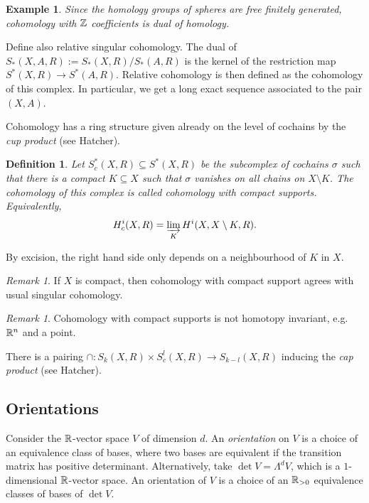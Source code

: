 \documentclass[A4paper, british]{amsart}
\theoremstyle{darkgreentheorem}
\theoremstyle{darkbluedefinition}
\newtheorem{defn}[thm]{Definition}
\theoremstyle{darkredexample}
\newtheorem{exa}[thm]{Example}
\theoremstyle{remark}
\newtheorem{rem}[thm]{Remark}
\newcommand{\1}{\mathbbm{1}}
\newcommand{\tms}{\times}
\newcommand{\sub}{\subseteq}
\begin{document}
\begin{exa}
    Since the homology groups of spheres are free finitely generated, cohomology with $\mathbb{Z}$ coefficients is dual of homology.
\end{exa}

Define also relative singular cohomology.
The dual of $S_{*}(X,A,R):=S_{*}(X,R)/S_{*}(A,R)$ is the kernel of the restriction map $S^{*}(X,R)\to S^{*}(A,R)$.
Relative cohomology is then defined as the cohomology of this complex.
In particular, we get a long exact sequence associated to the pair $(X,A)$.

Cohomology has a ring structure given already on the level of cochains by the \textit{cup product} (see Hatcher).

\begin{defn}
    Let $S_{c}^{*}(X,R)\sub S^{*}(X,R)$ be the subcomplex of cochains $\sigma$ such that there is a compact $K\sub X$ such that $\sigma$ vanishes on all chains on $X\setminus K$.
    The cohomology of this complex is called \textit{cohomology with compact supports}.
    Equivalently,
    \[ H^{i}_{c}(X,R)=\varinjlim_{K}H^{i}(X,X\setminus K,R). \]
\end{defn}

By excision, the right hand side only depends on a neighbourhood of $K$ in $X$.

\begin{rem}
    If $X$ is compact, then cohomology with compact support agrees with usual singular cohomology.
\end{rem}

\begin{rem}
    Cohomology with compact supports is not homotopy invariant, e.g. $\mathbb{R}^{n}$ and a point.
\end{rem}

There is a pairing $\cap \colon S_{k}(X,R)\tms S_{c}^{l}(X,R)\to S_{k-l}(X,R)$ inducing the \textit{cap product} (see Hatcher).

\subsection{Orientations}

Consider the $\mathbb{R}$-vector space $V$ of dimension $d$.
An \textit{orientation} on $V$ is a choice of an equivalence class of bases, where two bases are equivalent if the transition matrix has positive determinant.
Alternatively, take $\det{V}=\Lambda^{d}V$, which is a $1$-dimensional $\mathbb{R}$-vector space.
An orientation of $V$ is a choice of an $\mathbb{R}_{>0}$ equivalence classes of bases of $\det{V}$.
\end{document}

